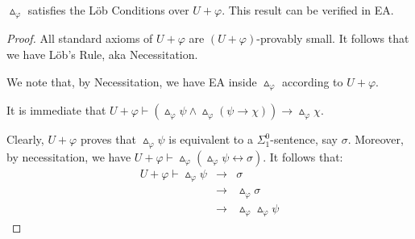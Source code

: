 \documentclass[10pt,a4paper]{amsart}
\newcommand{\apr}{{\vartriangle}}
\newcommand{\qedright}{\belowdisplayskip=-12pt}
\renewcommand{\iff}{\leftrightarrow}
\renewcommand{\phi}{\varphi}
\begin{document}
\begin{theorem}\label{loebsmurf}
$\apr_\phi$ satisfies the L\"ob Conditions over $U+\phi$.
This result can be verified in {\sf EA}.
\end{theorem}

\begin{proof}
All standard axioms of $U+\phi$ are $(U+\phi)$-provably small.
It follows that we have L\"ob's Rule, aka Necessitation.

We note that, by Necessitation, we have {\sf EA} inside $\apr_\phi$ according to 
$U+\phi$.

It is immediate that $U+\phi \vdash (\apr_\phi\psi \wedge \apr_\phi (\psi\to\chi)) \to \apr_\phi\chi$.

Clearly, $U+\phi$ proves that $\apr_\phi\psi$ is equivalent to a $\Sigma^0_1$-sentence, say $\sigma$.
Moreover, by necessitation, we have $U+\phi \vdash \apr_\phi(\apr_\phi\psi \iff \sigma)$. 
It follows that:\qedright
\begin{eqnarray*}
U+ \phi \vdash \apr_\phi\psi & \to & \sigma\\
& \to & \apr_\phi \sigma \\
& \to & \apr_\phi \apr_\phi \psi
\end{eqnarray*}
 \end{proof}
\end{document}
